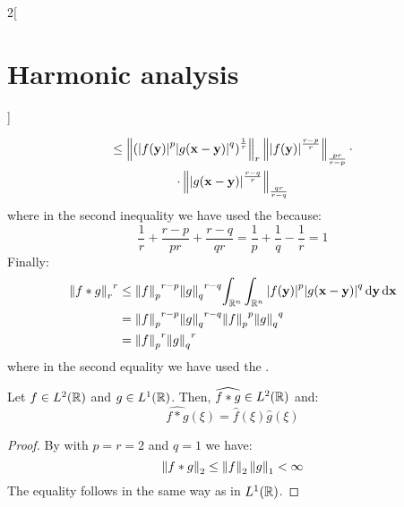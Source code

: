 \documentclass[../../../main_math.tex]{subfiles}
\begin{document}
\begin{multicols}{2}[\section{Harmonic analysis}]
\begin{sproof}
\begin{multline*}
      \leq \left\|{\left(\abs{f(\boldsymbol{\mathrm{y}})}^{p}\abs{g(\boldsymbol{\mathrm{x}}-\boldsymbol{\mathrm{y}})}^{q}\right)}^\frac{1}{r}\right\|_r\left\|\abs{f(\boldsymbol{\mathrm{y}})}^{\frac{r-p}{r}}\right\|_{\frac{pr}{r-p}}\cdot\\\cdot\left\|\abs{g(\boldsymbol{\mathrm{x}}-\boldsymbol{\mathrm{y}})}^{\frac{r-q}{r}}\right\|_{\frac{qr}{r-q}}
    \end{multline*}
    where in the second inequality we have used the  because:
    $$\frac{1}{r}+\frac{r-p}{pr}+\frac{r-q}{qr}=\frac{1}{p}+\frac{1}{q}-\frac{1}{r}=1$$
    Finally:
    \begin{align*}
      {\left\|f*g\right\|_r}^r & \leq {\left\|f\right\|_p}^{r-p}{\left\|g\right\|_q}^{r-q} \!\int_{\mathbb{R}^n}\int_{\mathbb{R}^n}\abs{f(\boldsymbol{\mathrm{y}})}^{p}\abs{g(\boldsymbol{\mathrm{x}}-\boldsymbol{\mathrm{y}})}^{q}\dd{\boldsymbol{\mathrm{y}}}\dd{\boldsymbol{\mathrm{x}}} \\
                       & ={\left\|f\right\|_p}^{r-p}{\left\|g\right\|_q}^{r-q} {\left\|f\right\|_p}^{p}{\left\|g\right\|_q}^{q}                                                                  \\
                       & ={\left\|f\right\|_p}^{r}{\left\|g\right\|_q}^{r}
    \end{align*}
    where in the second equality we have used the .
  \end{sproof}
  \begin{theorem}
    Let $f\in L^2(\mathbb{R})$ and $g\in L^1(\mathbb{R})$. Then, $\widehat{f*g}\in L^2(\mathbb{R})$ and:$$\widehat{f*g}(\xi)=\widehat{f}(\xi)\widehat{g}(\xi)$$
  \end{theorem}
  \begin{proof}
    By  with $p=r=2$ and $q=1$ we have:
    $$\left\|f*g\right\|_2\leq\left\|f\right\|_2\left\|g\right\|_1<\infty$$
    The equality follows in the same way as in $L^1(\mathbb{R})$.
  \end{proof}

\end{multicols}
\end{document}
